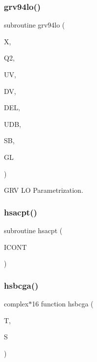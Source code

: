 \mbox{\label{djangoh__h_8f_a5a7b1f97eb6b9635e61f608e336d2312}} 
\subsubsection{\texorpdfstring{grv94lo()}{grv94lo()}}
{\footnotesize\ttfamily subroutine grv94lo (\begin{DoxyParamCaption}\item[{}]{X,  }\item[{}]{Q2,  }\item[{}]{UV,  }\item[{}]{DV,  }\item[{}]{D\+EL,  }\item[{}]{U\+DB,  }\item[{}]{SB,  }\item[{}]{GL }\end{DoxyParamCaption})}



G\+RV LO Parametrization. 

\mbox{\label{djangoh__h_8f_a55436ff7e1bd788550629bf01295b2ca}} 
\subsubsection{\texorpdfstring{hsacpt()}{hsacpt()}}
{\footnotesize\ttfamily subroutine hsacpt (\begin{DoxyParamCaption}\item[{}]{I\+C\+O\+NT }\end{DoxyParamCaption})}

\mbox{\label{djangoh__h_8f_a781ec07a20463ca988388d2121eb94d5}} 
\subsubsection{\texorpdfstring{hsbcga()}{hsbcga()}}
{\footnotesize\ttfamily complex$\ast$16 function hsbcga (\begin{DoxyParamCaption}\item[{}]{T,  }\item[{}]{S }\end{DoxyParamCaption})}

